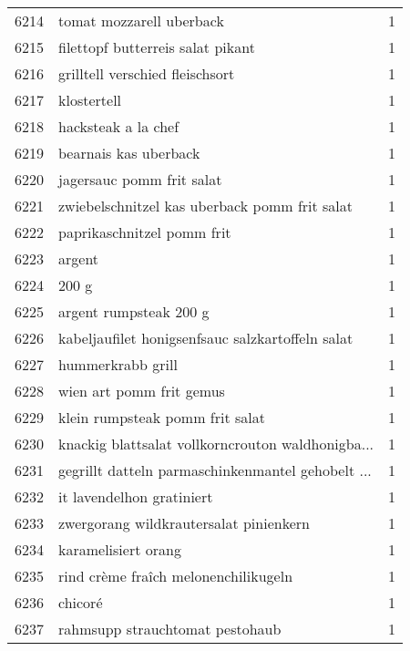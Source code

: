 \begin{tabular}{llr}
6214 &                           tomat mozzarell uberback &      1 \\
6215 &                  filettopf butterreis salat pikant &      1 \\
6216 &                    grilltell verschied fleischsort &      1 \\
6217 &                                        klostertell &      1 \\
6218 &                                hacksteak a la chef &      1 \\
6219 &                              bearnais kas uberback &      1 \\
6220 &                          jagersauc pomm frit salat &      1 \\
6221 &      zwiebelschnitzel kas uberback pomm frit salat &      1 \\
6222 &                         paprikaschnitzel pomm frit &      1 \\
6223 &                                             argent &      1 \\
6224 &                                              200 g &      1 \\
6225 &                             argent rumpsteak 200 g &      1 \\
6226 &   kabeljaufilet honigsenfsauc salzkartoffeln salat &      1 \\
6227 &                                  hummerkrabb grill &      1 \\
6228 &                           wien art pomm frit gemus &      1 \\
6229 &                    klein rumpsteak pomm frit salat &      1 \\
6230 &  knackig blattsalat vollkorncrouton waldhonigba... &      1 \\
6231 &  gegrillt datteln parmaschinkenmantel gehobelt ... &      1 \\
6232 &                          it lavendelhon gratiniert &      1 \\
6233 &             zwergorang wildkrautersalat pinienkern &      1 \\
6234 &                                karamelisiert orang &      1 \\
6235 &               rind crème fraîch melonenchilikugeln &      1 \\
6236 &                                            chicoré &      1 \\
6237 &                    rahmsupp strauchtomat pestohaub &      1 \\

\end{tabular}
